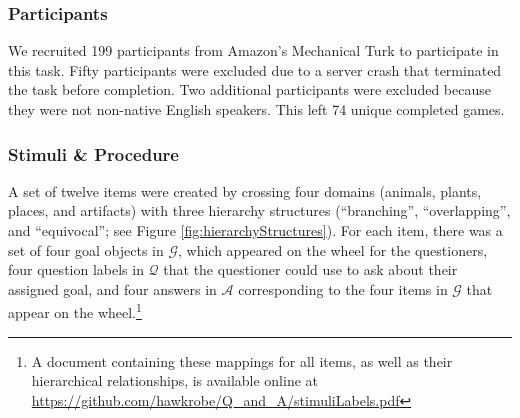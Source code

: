 \documentclass[12pt, floatsintext, jou]{apa6}
\begin{document}
\subsubsection{Participants} We recruited 199 participants
from Amazon's Mechanical Turk to participate in this task. Fifty participants were excluded due to a server crash that terminated the task before completion. Two additional participants were excluded because they were not non-native English speakers. This left 74 unique completed games.


\subsubsection{Stimuli \& Procedure} A set of twelve items were created by crossing four domains (animals, plants, places, and artifacts) with three hierarchy structures (``branching'', ``overlapping'', and ``equivocal''; see Figure \ref{fig:hierarchyStructures}). For each item, there was a set of four goal objects in $\mathcal{G}$, which appeared on the wheel for the questioners, four question labels in $\mathcal{Q}$ that the questioner could use to ask about their assigned goal, and four answers in $\mathcal{A}$ corresponding to the four items in $\mathcal{G}$ that appear on the wheel.\footnote{A document containing these mappings for all items, as well as their hierarchical relationships, is available online at \scriptsize	\url{https://github.com/hawkrobe/Q\_and\_A/stimuliLabels.pdf}} 
\end{document}
